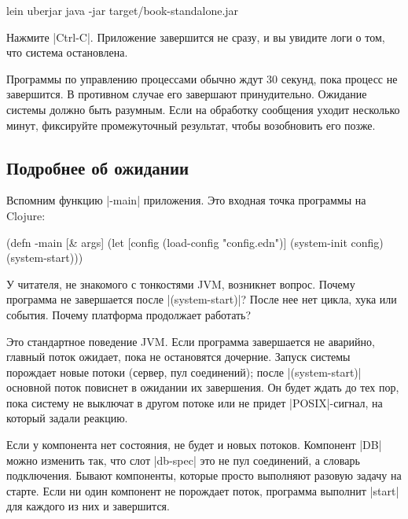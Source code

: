 \begin{english}
  \begin{bash}
lein uberjar
java -jar target/book-standalone.jar
  \end{bash}
\end{english}

Нажмите \spverb|Ctrl-C|. Приложение завершится не сразу, и вы увидите логи о
том, что система остановлена.

Программы по управлению процессами обычно ждут 30 секунд, пока процесс не
завершится. В противном случае его завершают принудительно. Ожидание системы
должно быть разумным. Если на обработку сообщения уходит несколько минут,
фиксируйте промежуточный результат, чтобы возобновить его позже.

\subsection{Подробнее об ожидании}

Вспомним функцию \spverb|-main| приложения. Это входная точка программы на
Clojure:

\begin{english}
  \begin{clojure}
(defn -main [& args]
  (let [config (load-config "config.edn")]
    (system-init config)
    (system-start)))
  \end{clojure}
\end{english}

У читателя, не знакомого с тонкостями JVM, возникнет вопрос. Почему программа не
завершается после \spverb|(system-start)|? После нее нет цикла, хука или
события. Почему платформа продолжает работать?

Это стандартное поведение JVM. Если программа завершается не аварийно, главный
поток ожидает, пока не остановятся дочерние. Запуск системы порождает новые
потоки (сервер, пул соединений); после \spverb|(system-start)| основной поток
повиснет в ожидании их завершения. Он будет ждать до тех пор, пока систему не
выключат в другом потоке или не придет \spverb|POSIX|-сигнал, на который задали
реакцию.

Если у компонента нет состояния, не будет и новых потоков. Компонент \spverb|DB|
можно изменить так, что слот \spverb|db-spec| это не пул соединений, а словарь
подключения. Бывают компоненты, которые просто выполняют разовую задачу на
старте. Если ни один компонент не порождает поток, программа выполнит
\spverb|start| для каждого из них и завершится.

